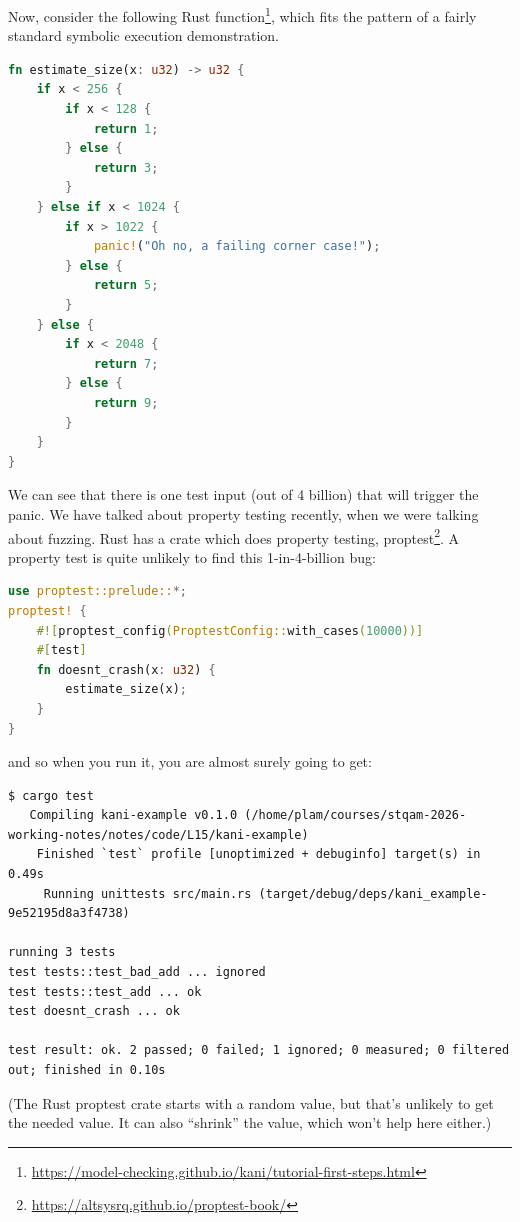 \documentclass[11pt]{article}
\begin{document}
Now, consider the following Rust function\footnote{\url{https://model-checking.github.io/kani/tutorial-first-steps.html}},
which fits the pattern of a fairly standard symbolic execution demonstration.
\begin{lstlisting}[language=Rust]
  fn estimate_size(x: u32) -> u32 {
    if x < 256 {
        if x < 128 {
            return 1;
        } else {
            return 3;
        }
    } else if x < 1024 {
        if x > 1022 {
            panic!("Oh no, a failing corner case!");
        } else {
            return 5;
        }
    } else {
        if x < 2048 {
            return 7;
        } else {
            return 9;
        }
    }
}
\end{lstlisting}
We can see that there is one test input (out of 4 billion) that will trigger the panic. We have talked about property testing
recently, when we were talking about fuzzing. Rust has a crate which does property testing, proptest\footnote{\url{https://altsysrq.github.io/proptest-book/}}. A property test is quite unlikely to find this 1-in-4-billion bug:
\begin{lstlisting}[language=Rust]
use proptest::prelude::*;
proptest! {
    #![proptest_config(ProptestConfig::with_cases(10000))]
    #[test]
    fn doesnt_crash(x: u32) {
        estimate_size(x);
    }
}
\end{lstlisting}
and so when you run it, you are almost surely going to get:
{\scriptsize
\begin{verbatim}
$ cargo test
   Compiling kani-example v0.1.0 (/home/plam/courses/stqam-2026-working-notes/notes/code/L15/kani-example)
    Finished `test` profile [unoptimized + debuginfo] target(s) in 0.49s
     Running unittests src/main.rs (target/debug/deps/kani_example-9e52195d8a3f4738)

running 3 tests
test tests::test_bad_add ... ignored
test tests::test_add ... ok
test doesnt_crash ... ok

test result: ok. 2 passed; 0 failed; 1 ignored; 0 measured; 0 filtered out; finished in 0.10s
\end{verbatim}
}
(The Rust proptest crate starts with a random value, but that's unlikely to get the
needed value. 
It can also ``shrink'' the value, which won't help here either.)
\end{document}
